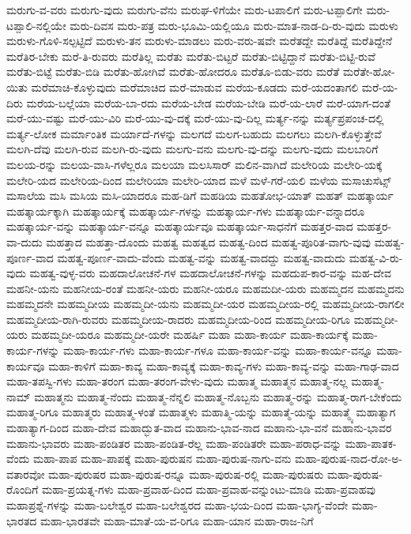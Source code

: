 {ಮರುಗು-ವ-ವರು
ಮರುಗು-ವುದು
ಮರುಗು-ವೆನು
ಮರುಘ-ಳಿಗೆಯೇ
ಮರು-ಟಪಾಲಿಗೆ
ಮರು-ಟಪ್ಪಾಲಿಗೇ
ಮರು-ಟಪ್ಪಾಲಿ-ನಲ್ಲಿಯೇ
ಮರು-ದಿವಸ
ಮರು-ಪತ್ರ
ಮರು-ಭೂಮಿ-ಯಲ್ಲಿಯೂ
ಮರು-ಮಾತ-ನಾಡ-ದಿ-ರು-ವುದು
ಮರುಳು
ಮರುಳು-ಗೊಳಿ-ಸಲ್ಪಟ್ಟಿದೆ
ಮರುಳು-ತನ
ಮರುಳು-ಮಾಡಲು
ಮರು-ವರು-ಷವೇ
ಮರೆತದ್ದೇ
ಮರೆತಿದ್ದೆ
ಮರೆತಿದ್ದೇನೆ
ಮರೆತಿರ-ಬೇಕು
ಮರೆ-ತಿ-ರುವರು
ಮರೆತಿಲ್ಲ
ಮರೆತು
ಮರೆತು-ಬಿಟ್ಟರೆ
ಮರೆತು-ಬಿಟ್ಟಿದ್ದಾನೆ
ಮರೆತು-ಬಿಟ್ಟಿ-ರುವೆ
ಮರೆತು-ಬಿಟ್ಟೆ
ಮರೆತು-ಬಿಡಿ
ಮರೆತು-ಹೋಗಿವೆ
ಮರೆತು-ಹೋದರೂ
ಮರೆತೂ-ಬಿಡು-ವರು
ಮರೆತೆ
ಮರೆತೇ-ಹೋ-ಯಿತು
ಮರೆಮಾಚಿ-ಕೊಳ್ಳುವುದು
ಮರೆಮಾಚಿದ
ಮರೆ-ಮಾಡುವ
ಮರೆಯ-ಕೂಡದು
ಮರೆ-ಯದಂತಾಗಲಿ
ಮರೆ-ಯ-ದಿರು
ಮರೆಯ-ಬಲ್ಲೆಯಾ
ಮರೆಯ-ಬಾ-ರದು
ಮರೆಯ-ಬೇಡ
ಮರೆಯ-ಬೇಡಿ
ಮರೆ-ಯ-ಲಾರೆ
ಮರೆ-ಯಾಗ-ದಂತೆ
ಮರೆ-ಯು-ವಷ್ಟು
ಮರೆ-ಯು-ವಿರಿ
ಮರೆ-ಯು-ವು-ದಕ್ಕೆ
ಮರೆ-ಯು-ವು-ದಿಲ್ಲ
ಮರ್ತ್ಯ-ನನ್ನು
ಮರ್ತ್ಯಪ್ರಪಂಚ-ದಲ್ಲಿ
ಮರ್ತ್ಯ-ಲೋಕ
ಮರ್ಮಾಂತಿಕ
ಮರ್ಯಾದೆ-ಗಳನ್ನು
ಮಲಗದೆ
ಮಲಗ-ಬಹುದು
ಮಲಗಲು
ಮಲಗಿ-ಕೊಳ್ಳುತ್ತೇವೆ
ಮಲಗಿ-ದೆವು
ಮಲಗಿ-ರುವ
ಮಲಗಿ-ರು-ವುದು
ಮಲಗು-ವನು
ಮಲಗು-ವು-ದನ್ನು
ಮಲಗು-ವುದು
ಮಲಬಾರಿಗೆ
ಮಲಯ-ರನ್ನು
ಮಲಯ-ವಾಸಿ-ಗಳೆಲ್ಲರೂ
ಮಲಯಾ
ಮಲಸಿಸಾರ್
ಮಲಿನ-ವಾಗಿದೆ
ಮಲೇರಿಯ
ಮಲೇರಿ-ಯಕ್ಕೆ
ಮಲೇರಿ-ಯದ
ಮಲೇರಿಯ-ದಿಂದ
ಮಲೇರಿಯಾ
ಮಲೇರಿ-ಯಾದ
ಮಳೆ
ಮಳೆ-ಗರೆ-ಯಲಿ
ಮಳೆಯ
ಮಸಾಚುಸೆಟ್ಸ್
ಮಸಾಲೆಯ
ಮಸಿ
ಮಸಿಯ
ಮಸಿ-ಯಾದರೂ
ಮಹ-ಡಿಗೆ
ಮಹಡಿಯ
ಮಹತೋಭ-ಯಾತ್
ಮಹತ್
ಮಹತ್ಕಾರ್ಯ
ಮಹತ್ಕಾರ್ಯಕ್ಕಾಗಿ
ಮಹತ್ಕಾರ್ಯಕ್ಕೆ
ಮಹತ್ಕಾರ್ಯ-ಗಳನ್ನು
ಮಹತ್ಕಾರ್ಯ-ಗಳು
ಮಹತ್ಕಾರ್ಯ-ವನ್ನಾದರೂ
ಮಹತ್ಕಾರ್ಯ-ವನ್ನು
ಮಹತ್ಕಾರ್ಯ-ವನ್ನೂ
ಮಹತ್ಕಾರ್ಯವೂ
ಮಹತ್ಕಾರ್ಯ-ಸಾಧನೆಗೆ
ಮಹತ್ತರ-ವಾದ
ಮಹತ್ತರ-ವಾ-ದುದು
ಮಹತ್ತಾದ
ಮಹತ್ತಾ-ದೊಂದು
ಮಹತ್ವ
ಮಹತ್ವದ
ಮಹತ್ವ-ದಿಂದ
ಮಹತ್ವ-ಪೂರಿತ-ವಾಗು-ವುವು
ಮಹತ್ವ-ಪೂರ್ಣ-ವಾದ
ಮಹತ್ವ-ಪೂರ್ಣ-ವಾದು-ವೆಂದು
ಮಹತ್ವ-ವನ್ನು
ಮಹತ್ವ-ವಾದದ್ದು
ಮಹತ್ವ-ವಾದುದು
ಮಹತ್ವ-ವಿ-ರು-ವುದು
ಮಹತ್ವ-ವುಳ್ಳ-ವರು
ಮಹದಾಲೋಚನೆ-ಗಳ
ಮಹದಾಲೋಚನೆ-ಗಳನ್ನು
ಮಹದುಪ-ಕಾರ-ವನ್ನು
ಮಹ-ದೇವ
ಮಹನೀ-ಯನು
ಮಹನೀಯ-ರಂತೆ
ಮಹನೀ-ಯರು
ಮಹನೀ-ಯರೂ
ಮಹಮದೀ-ಯರು
ಮಹಮ್ಮದನ
ಮಹಮ್ಮದನು
ಮಹಮ್ಮದನೇ
ಮಹಮ್ಮದೀಯ
ಮಹಮ್ಮದೀ-ಯನು
ಮಹಮ್ಮದೀ-ಯರ
ಮಹಮ್ಮದೀಯ-ರಲ್ಲಿ
ಮಹಮ್ಮದೀಯ-ರಾಗಲೀ
ಮಹಮ್ಮದೀಯ-ರಾಗಿ-ರುವರು
ಮಹಮ್ಮದೀಯ-ರಾದರು
ಮಹಮ್ಮದೀಯ-ರಿಂದ
ಮಹಮ್ಮದೀಯ-ರಿಗೂ
ಮಹಮ್ಮದೀ-ಯರು
ಮಹಮ್ಮದೀ-ಯರೂ
ಮಹಮ್ಮದೀ-ಯರೇ
ಮಹರ್ಷಿ
ಮಹಾ
ಮಹಾ-ಕಾರ್ಯ
ಮಹಾ-ಕಾರ್ಯಕ್ಕೆ
ಮಹಾ-ಕಾರ್ಯ-ಗಳನ್ನು
ಮಹಾ-ಕಾರ್ಯ-ಗಳು
ಮಹಾ-ಕಾರ್ಯ-ಗಳೂ
ಮಹಾ-ಕಾರ್ಯ-ವನ್ನು
ಮಹಾ-ಕಾರ್ಯ-ವನ್ನೂ
ಮಹಾ-ಕಾರ್ಯವೂ
ಮಹಾ-ಕಾಳಿಗೆ
ಮಹಾ-ಕಾವ್ಯ
ಮಹಾ-ಕಾವ್ಯಕ್ಕೆ
ಮಹಾ-ಕಾವ್ಯ-ಗಳು
ಮಹಾ-ಕಾವ್ಯ-ವನ್ನು
ಮಹಾ-ಗಾಢ-ವಾದ
ಮಹಾ-ತಪಸ್ವಿ-ಗಳು
ಮಹಾ-ತರಂಗ
ಮಹಾ-ತರಂಗ-ವೇಳು-ವುದು
ಮಹಾತ್ಮ
ಮಹಾತ್ಮನ
ಮಹಾತ್ಮ-ನಲ್ಲ
ಮಹಾತ್ಮ-ನಾಮ್
ಮಹಾತ್ಮನು
ಮಹಾತ್ಮ-ನೆಂದು
ಮಹಾತ್ಮ-ನೆನ್ನಲಿ
ಮಹಾತ್ಮ-ನೊಬ್ಬನು
ಮಹಾತ್ಮ-ರನ್ನು
ಮಹಾತ್ಮ-ರಾಗ-ಬೇಕೆಂದು
ಮಹಾತ್ಮ-ರಿಗೂ
ಮಹಾತ್ಮರು
ಮಹಾತ್ಮ-ಳಂತೆ
ಮಹಾತ್ಮಳು
ಮಹಾತ್ಮಿ-ಯನ್ನು
ಮಹಾತ್ಮೆ-ಯನ್ನು
ಮಹಾತ್ಮ್ಯೆ
ಮಹಾತ್ಯಾಗ
ಮಹಾತ್ಯಾಗ-ದಿಂದ
ಮಹಾ-ದೇವ
ಮಹಾದ್ಭುತ-ವಾದ
ಮಹಾನು-ಭಾವ-ನಾದ
ಮಹಾನು-ಭಾ-ವನೆ
ಮಹಾನು-ಭಾವರ
ಮಹಾನು-ಭಾವರು
ಮಹಾ-ಪಂಡಿತರ
ಮಹಾ-ಪಂಡಿತ-ರೆಲ್ಲ
ಮಹಾ-ಪಂಡಿತರೇ
ಮಹಾ-ಪರಾಧ-ವನ್ನು
ಮಹಾ-ಪಾತಕ-ವೆಂದು
ಮಹಾ-ಪಾಪ
ಮಹಾ-ಪಾಪಕ್ಕೆ
ಮಹಾ-ಪುರುಷನ
ಮಹಾ-ಪುರುಷ-ನಾಗು-ವನು
ಮಹಾ-ಪುರುಷ-ನಾದ-ರೋ-ಅ-ವತಾರವೋ
ಮಹಾ-ಪುರುಷರ
ಮಹಾ-ಪುರುಷ-ರನ್ನೂ
ಮಹಾ-ಪುರುಷ-ರಲ್ಲಿ
ಮಹಾ-ಪುರುಷರು
ಮಹಾ-ಪುರುಷ-ರೊಂದಿಗೆ
ಮಹಾ-ಪ್ರಯತ್ನ-ಗಳು
ಮಹಾ-ಪ್ರವಾಹ-ದಿಂದ
ಮಹಾ-ಪ್ರವಾಹ-ವನ್ನುಂಟು-ಮಾಡಿ
ಮಹಾ-ಪ್ರವಾಹವು
ಮಹಾಪ್ರಶ್ನೆ-ಗಳನ್ನು
ಮಹಾ-ಬಲೇಶ್ವರ
ಮಹಾ-ಬಲೇಶ್ವರದ
ಮಹಾ-ಭಯ-ದಿಂದ
ಮಹಾ-ಭಾಗ್ಯ-ವೆಂದೇ
ಮಹಾ-ಭಾರತದ
ಮಹಾ-ಭಾರತವೇ
ಮಹಾ-ಮಾತೆ-ಯ-ವ-ರಿಗೂ
ಮಹಾ-ಯಾನ
ಮಹಾ-ರಾಜ-ನಿಗೆ
}
